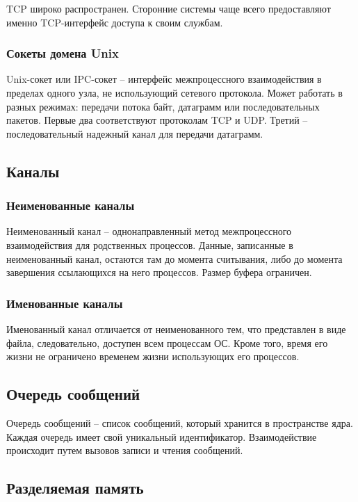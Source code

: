 TCP широко распространен. Сторонние системы чаще всего предоставляют именно TCP-интерфейс доступа к своим службам.

\subsubsection{Сокеты домена Unix}

Unix-сокет или IPC-сокет -- интерфейс межпроцессного взаимодействия в пределах одного узла, не использующий сетевого протокола. Может работать в разных режимах: передачи потока байт, датаграмм или последовательных пакетов. Первые два соответствуют протоколам TCP и UDP. Третий -- последовательный надежный канал для передачи датаграмм.

\subsection{Каналы}

\subsubsection{Неименованные каналы}

Неименованный канал -- однонаправленный метод межпроцессного взаимодействия для родственных процессов. Данные, записанные в неименованный канал, остаются там до момента считывания, либо до момента завершения ссылающихся на него процессов. Размер буфера ограничен.

\subsubsection{Именованные каналы}

Именованный канал отличается от неименованного тем, что представлен в виде файла, следовательно, доступен всем процессам ОС. Кроме того, время его жизни не ограничено временем жизни использующих его процессов.

\subsection{Очередь сообщений}

Очередь сообщений -- список сообщений, который хранится в пространстве ядра. Каждая очередь имеет свой уникальный идентификатор. Взаимодействие происходит путем вызовов записи и чтения сообщений.

\subsection{Разделяемая память}

